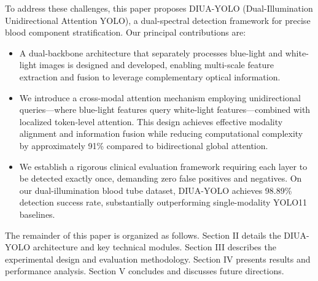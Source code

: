 To address these challenges, this paper proposes DIUA-YOLO (Dual-Illumination Unidirectional Attention YOLO), a dual-spectral detection framework for precise blood component stratification. Our principal contributions are:

\begin{itemize}
    \item A dual-backbone architecture that separately processes blue-light and white-light images is designed and developed, enabling multi-scale feature extraction and fusion to leverage complementary optical information. 
    \item We introduce a cross-modal attention mechanism employing unidirectional queries—where blue-light features query white-light features—combined with localized token-level attention. This design achieves effective modality alignment and information fusion while reducing computational complexity by approximately 91\% compared to bidirectional global attention. 
    \item We establish a rigorous clinical evaluation framework requiring each layer to be detected exactly once, demanding zero false positives and negatives. On our dual-illumination blood tube dataset, DIUA-YOLO achieves 98.89\% detection success rate, substantially outperforming single-modality YOLO11 baselines. 
\end{itemize}

The remainder of this paper is organized as follows. Section II details the DIUA-YOLO architecture and key technical modules. Section III describes the experimental design and evaluation methodology. Section IV presents results and performance analysis. Section V concludes and discusses future directions.